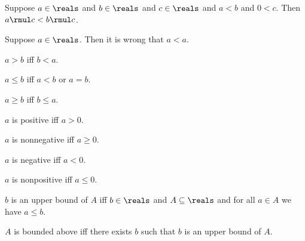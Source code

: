 \begin{axiom}\label{real_lt_mul_pos}
    Suppose $a\in\reals$ and $b\in\reals$ and $c\in\reals$ and $a < b$ and $0 < c$.
    Then $a \rmul c < b \rmul c$.
\end{axiom}

\begin{axiom}\label{real_lt_irreflexive}
    Suppose $a\in\reals$.
    Then it is wrong that $a < a$.
\end{axiom}

\begin{abbreviation}\label{real_gt}
    $a > b$ iff $b < a$.
\end{abbreviation}

\begin{abbreviation}\label{real_at_most}
    $a \leq b$ iff $a < b$ or $a = b$.
\end{abbreviation}

\begin{abbreviation}\label{real_at_least}
    $a \geq b$ iff $b \leq a$.
\end{abbreviation}

\begin{abbreviation}\label{real_positive}
    $a$ is positive iff $a > 0$.
\end{abbreviation}

\begin{abbreviation}\label{real_nonnegative}
    $a$ is nonnegative iff $a \geq 0$.
\end{abbreviation}

\begin{abbreviation}\label{real_negative}
    $a$ is negative iff $a < 0$.
\end{abbreviation}

\begin{abbreviation}\label{real_nonpositive}
    $a$ is nonpositive iff $a \leq 0$.
\end{abbreviation}


\begin{definition}\label{real_upper_bound}
    $b$ is an upper bound of $A$ iff $b\in\reals$ and $A\subseteq\reals$ and for all $a\in A$ we have $a \leq b$.
\end{definition}

\begin{definition}\label{real_bounded_above}
    $A$ is bounded above iff there exists $b$ such that $b$ is an upper bound of $A$.
\end{definition}

